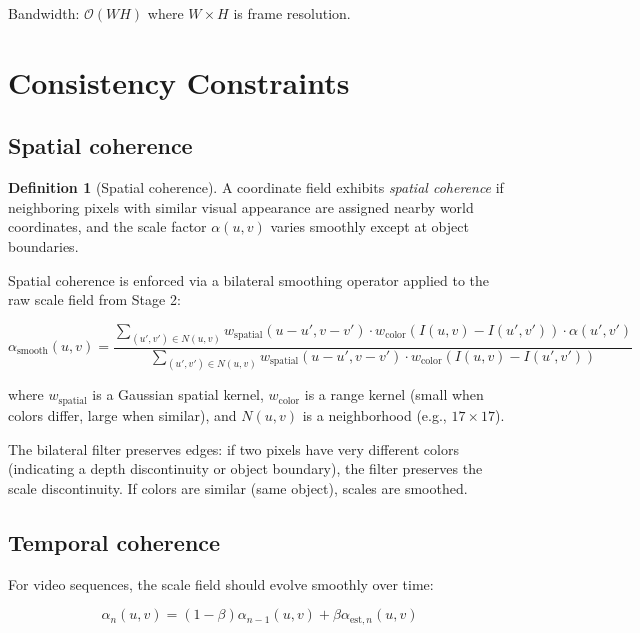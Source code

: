 \documentclass[11pt,twocolumn,a4paper]{article}
\theoremstyle{definition}
\newtheorem{definition}[theorem]{Definition}
\begin{document}
Bandwidth: $\mathcal{O}(W H)$ where $W \times H$ is frame resolution.

\section{Consistency Constraints}
\label{sec:consistency}

\subsection{Spatial coherence}

\begin{definition}[Spatial coherence]
\label{def:spatial_coh}
A coordinate field exhibits \emph{spatial coherence} if neighboring pixels with similar visual appearance are assigned nearby world coordinates, and the scale factor $\alpha(u,v)$ varies smoothly except at object boundaries.
\end{definition}

Spatial coherence is enforced via a bilateral smoothing operator applied to the raw scale field from Stage 2:

\begin{equation}
\alpha_{\text{smooth}}(u,v) = \frac{\sum_{(u',v') \in N(u,v)} w_{\text{spatial}}(u-u',v-v') \cdot w_{\text{color}}(I(u,v) - I(u',v')) \cdot \alpha(u',v')}{\sum_{(u',v') \in N(u,v)} w_{\text{spatial}}(u-u',v-v') \cdot w_{\text{color}}(I(u,v) - I(u',v'))}
\end{equation}

where $w_{\text{spatial}}$ is a Gaussian spatial kernel, $w_{\text{color}}$ is a range kernel (small when colors differ, large when similar), and $N(u,v)$ is a neighborhood (e.g., $17 \times 17$).

The bilateral filter preserves edges: if two pixels have very different colors (indicating a depth discontinuity or object boundary), the filter preserves the scale discontinuity. If colors are similar (same object), scales are smoothed.

\subsection{Temporal coherence}

For video sequences, the scale field should evolve smoothly over time:

\begin{equation}
\alpha_{n}(u,v) = (1 - \beta) \alpha_{n-1}(u,v) + \beta \alpha_{\text{est},n}(u,v)
\end{equation}
\end{document}
